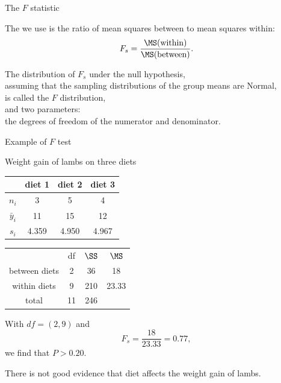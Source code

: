 \begin{frame}{The $F$ statistic}

    The  we use is the ratio of mean squares between to mean squares within:
    \[
        F_s = \frac{ \MS(\text{within}) }{ \MS(\text{between}) } .
    \]


    \vspace{2em}

    The distribution of $F_s$ under the null hypothesis,  \\
    assuming that the sampling distributions of the group means are Normal, \\
    is called the \alert{$F$ distribution}, \\
    and  two parameters: \\
    the degrees of freedom of the numerator and denominator.


\end{frame}


\begin{frame}{Example of $F$ test}

    Weight gain of lambs on three diets
    \begin{center}
        \begin{tabular}{cccc}
            & diet 1 & diet 2 & diet 3 \\
            \hline
            $n_i$ & 3 & 5 & 4 \\
            $\bar y_i$ & 11 & 15 & 12 \\
            $s_i$ & 4.359 & 4.950 & 4.967 \\
        \end{tabular}
    \end{center}

    \pause

    \begin{center}
        \begin{tabular}{cccc}
            & df & $\SS$ & $\MS$ \\
            between diets & 2 & 36 & 18 \\
            within diets & 9 & 210 & 23.33 \\
            \hline
            total & 11 & 246 & \\
        \end{tabular}
    \end{center}


    \vspace{2em}

    With $df = (2,9)$ and
    \[ F_s = \frac{ 18 }{ 23.33 } = 0.77 , \]
    we find that $P > 0.20$.


    \vspace{2em}

    \pause
    There is not good evidence that diet affects the weight gain of lambs.


\end{frame}




